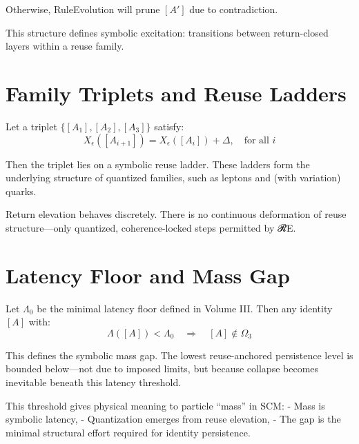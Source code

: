 Otherwise, RuleEvolution will prune $[A']$ due to contradiction.

This structure defines symbolic excitation: transitions between return-closed layers within a reuse family.

\section{Family Triplets and Reuse Ladders} \label{sec:reuse-ladders}

Let a triplet $\{[A_1], [A_2], [A_3]\}$ satisfy:
\[
X_\epsilon([A_{i+1}]) = X_\epsilon([A_i]) + \Delta,\quad \text{for all } i
\]

Then the triplet lies on a symbolic reuse ladder. These ladders form the underlying structure of quantized families, such as leptons and (with variation) quarks.

Return elevation behaves discretely. There is no continuous deformation of reuse structure—only quantized, coherence-locked steps permitted by 𝓡E.

\section{Latency Floor and Mass Gap} \label{sec:mass-gap}

Let $\Lambda_0$ be the minimal latency floor defined in Volume III. Then any identity $[A]$ with:
\[
\Lambda([A]) < \Lambda_0
\quad \Rightarrow \quad
[A] \notin \Omega_3
\]

This defines the symbolic mass gap. The lowest reuse-anchored persistence level is bounded below—not due to imposed limits, but because collapse becomes inevitable beneath this latency threshold.

This threshold gives physical meaning to particle “mass” in SCM:
- Mass is symbolic latency,
- Quantization emerges from reuse elevation,
- The gap is the minimal structural effort required for identity persistence.

